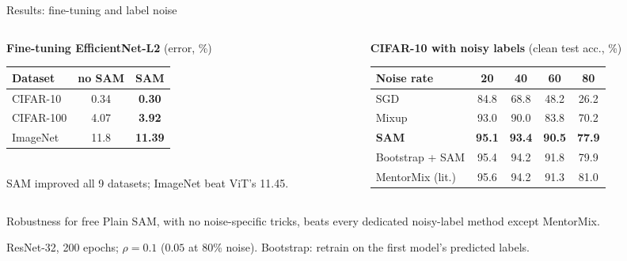 \documentclass[aspectratio=169,10pt]{beamer}
\newcommand{\mt}[1]{\textcolor{muted}{#1}}
\newcommand{\source}[1]{\par\vfill{\scriptsize\mt{#1}}}
\newcommand{\best}[1]{\textbf{#1}}
\begin{document}
\begin{frame}{Results: fine-tuning and label noise}
\begin{columns}[T]
\begin{column}{0.42\textwidth}
\centering\small
\textbf{Fine-tuning EfficientNet-L2} \mt{(error, \%)}\\[3pt]
\begin{tabular}{@{}lcc@{}}
\toprule
Dataset & no SAM & SAM\\
\midrule
CIFAR-10 & 0.34 & \best{0.30}\\
CIFAR-100 & 4.07 & \best{3.92}\\
ImageNet & 11.8 & \best{11.39}\\
\bottomrule
\end{tabular}\\[4pt]
\mt{\scriptsize SAM improved all 9 datasets; ImageNet beat ViT's 11.45.}
\end{column}
\begin{column}{0.56\textwidth}
\centering\small
\textbf{CIFAR-10 with noisy labels} \mt{(clean test acc., \%)}\\[3pt]
\begin{tabular}{@{}lcccc@{}}
\toprule
Noise rate & 20 & 40 & 60 & 80\\
\midrule
SGD & 84.8 & 68.8 & 48.2 & 26.2\\
Mixup & 93.0 & 90.0 & 83.8 & 70.2\\
\textbf{SAM} & \best{95.1} & \best{93.4} & \best{90.5} & \best{77.9}\\
Bootstrap + SAM & 95.4 & 94.2 & 91.8 & 79.9\\
\mt{MentorMix (lit.)} & \mt{95.6} & \mt{94.2} & \mt{91.3} & \mt{81.0}\\
\bottomrule
\end{tabular}
\end{column}
\end{columns}
\vspace{0.8em}
\begin{exampleblock}{Robustness for free}
Plain SAM, with no noise-specific tricks, beats every dedicated noisy-label method except MentorMix.
\end{exampleblock}
\source{ResNet-32, 200 epochs; $\rho=0.1$ ($0.05$ at 80\% noise). Bootstrap: retrain on the first model's predicted labels.}
\end{frame}
\end{document}
